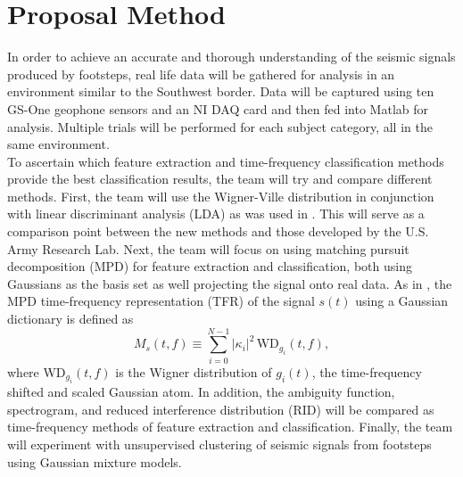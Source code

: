 \documentclass{article}[11pt]
\begin{document}
\section{Proposal Method}
\label{sec:procedure}
In order to achieve an accurate and thorough understanding of the seismic signals produced by footsteps, real life data will be gathered for analysis in an environment similar to the Southwest border. Data will be captured using ten GS-One geophone sensors and an NI DAQ card and then fed into Matlab for analysis. Multiple trials will be performed for each subject category, all in the same environment. \\ 
\indent To ascertain which feature extraction and time-frequency classification methods provide the best classification results, the team will try and compare different methods. First, the team will use the Wigner-Ville distribution in conjunction with linear discriminant analysis (LDA) as was used in \cite{Mehmood2012}.  This will serve as a comparison point between the new methods and those developed by the U.S. Army Research Lab. Next, the team will focus on using matching pursuit decomposition (MPD) for feature extraction and classification, both using Gaussians as the basis set as well projecting the signal onto real data.  As in \cite{Larsen2013}, the MPD time-frequency representation (TFR) of 
 the signal $s(t)$ using a Gaussian dictionary is defined as
\begin{equation}
M_s(t,f) \equiv \sum^{N-1}_{i=0} |\kappa_{i}|^{2} \, 
\text{WD}_{g_{i}}(t,f),
\label{eq:gaus}
\end{equation}
where WD$_{g_i}(t, f)$ is the Wigner distribution of $g_i(t)$, 
the time-frequency shifted and scaled Gaussian atom.  In addition, the ambiguity function, spectrogram, and reduced interference distribution (RID) will be compared as time-frequency methods of feature extraction and classification. Finally, the team will experiment with unsupervised clustering of seismic signals from footsteps using Gaussian mixture models. 
\end{document}
